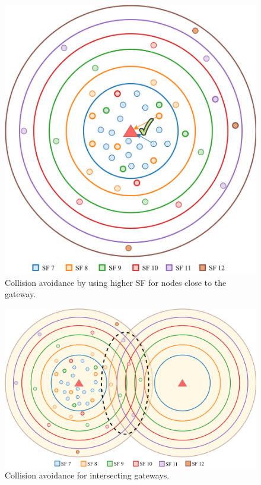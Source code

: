 \documentclass[conference]{IEEEtran}
\begin{document}
\begin{figure}
\centering
\includegraphics[width=0.83\linewidth]{collision_solution_single_gw.png}
\caption{Collision avoidance by using higher SF for nodes close to the gateway.}
\label{fig:collision_solution_single_gw}
\end{figure}

\begin{figure}
\centering
\includegraphics[width=\linewidth]{collision_solution_multi_gw.png}
\caption{Collision avoidance for intersecting gateways.}
\label{fig:collision_solution_multi_gw}
\end{figure}
\end{document}
